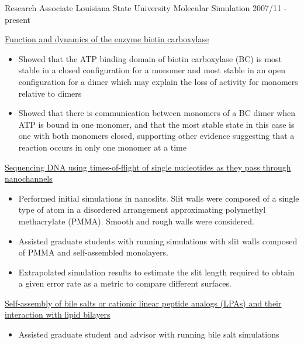 \pagebreak


\begin{cventries}
  \cventry
    {Research Associate} %
    {Louisiana State University} %
    {Molecular Simulation} %
    {2007/11 - present} %
    {
      \begin{cvitems} %
        \item {\underline{Function and dynamics of the enzyme biotin carboxylase}}
            \begin{itemize}
            \item {Showed that the ATP binding domain of biotin carboxylase (BC) is most stable in a closed configuration for a monomer and most stable in an open configuration for a dimer which may explain the loss of activity for monomers relative to dimers}
            \item {Showed that there is communication between monomers of a BC dimer when ATP is bound in one monomer, and that the most stable state in this case is one with both monomers closed, supporting other evidence suggesting that a reaction occurs in only one monomer at a time}
            \end{itemize}
        \item {\underline{Sequencing DNA using times-of-flight of single nucleotides as they pass through nanochannels}}
            \begin{itemize}
            \item {Performed initial simulations in nanoslits. Slit walls were composed of a single type of atom in a disordered arrangement approximating polymethyl methacrylate (PMMA). Smooth and rough walls were considered.}
            \item {Assisted graduate students with running simulations with slit walls composed of PMMA and self-assembled monolayers.}
            \item {Extrapolated simulation results to estimate the slit length required to obtain a given error rate as a metric to compare different surfaces.}
            \end{itemize}        
        \item {\underline{Self-assembly of bile salts or cationic linear peptide analogs (LPAs) and their interaction with lipid bilayers}}
            \begin{itemize}
            \item {Assisted graduate student and advisor with running bile salt simulations}

\end{itemize}
\end{cvitems}}
\end{cventries}
